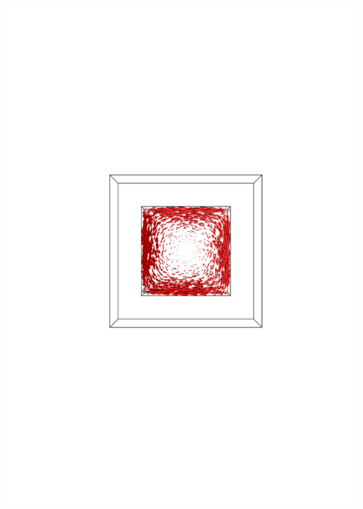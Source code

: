 \documentclass[compress]{beamer}
\begin{document}
\begin{frame}
\begin{columns}[totalwidth=\textwidth]
\begin{column}{.35\textwidth}
	\includegraphics[width=0.99\textwidth]{Graphic/04_B3cubeeddy3MHz_XYview.pdf}
	\end{column}
\end{columns}
\end{frame}
\end{document}
